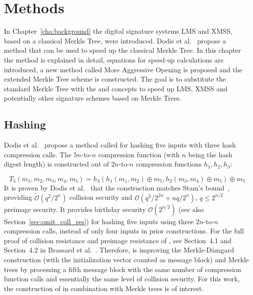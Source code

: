 \chapter{Methods}
\label{cha:methods}
In Chapter~\ref{cha:background} the digital signature systems LMS and XMSS, based on a classical Merkle Tree, were introduced. Dodis et al.~\cite{T5_paper} propose a method \tf that can be used to speed up the classical Merkle Tree. In this chapter the \tf method is explained in detail, equations for speed-up calculations are introduced, a new method called More Aggressive Opening is proposed and the extended Merkle Tree scheme \extree is constructed. The goal is to substitute the standard Merkle Tree with the \tftree and \extree concepts to speed up LMS, XMSS and potentially other signature schemes based on Merkle Trees.

\section{\texorpdfstring{\tf}{T5} Hashing}
Dodis et al.~\cite{T5_paper} propose a method called \tf for hashing five inputs with three hash compression calls. The $5n$-to-$n$ compression function \tf (with $n$ being the hash digest length) is constructed out of $2n$-to-$n$ compression functions $h_1, h_2, h_3$:

\begin{equation}
\label{eq:t5_basic}
T_5(m_1, m_2, m_3, m_4, m_5) = h_3(h_1(m_1,m_2) \oplus m_5, h_2(m_3,m_4) \oplus m_5) \oplus m_5
\end{equation}
It is proven by Dodis et al.~\cite{T5_paper} that the \tf construction matches Stam’s bound~\cite{stams_bound2008}, providing $\tilde{\mathcal{O}}(q^2/2^n)$ collision security and $\mathcal{O}(q^3/2^{2n}+nq/2^n)$, $q \leq 2^{n/2}$ preimage security. It provides birthday security $\mathcal{O}(2^{n/2})$ (see also Section~\ref{sec:omit_coll_res}) for hashing five inputs using three $2n$-to-$n$ compression calls, instead of only four inputs in prior constructions. For the full proof of collision resistance and preimage resistance of \tf, see Section~4.1 and Section~4.2 in Brassard et al.~\cite{T5_paper}. 
Therefore, \tf is improving the Merkle-D\aa mgard construction (with the initialization vector counted as message block) and Merkle trees by processing a fifth message block with the same number of compression function calls and essentially the same level of collision security. 
For this work, the construction of \tf in combination with Merkle trees is of interest.  

